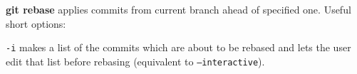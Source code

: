 %

\textbf{git rebase} applies commits from current branch ahead of specified one.
Useful short options:
\begin{compactenum}
\item [\texttt{-i}] makes a list of the commits which are about to be rebased and lets the user edit that list before rebasing (equivalent to \texttt{--interactive}).
\end{compactenum}

%